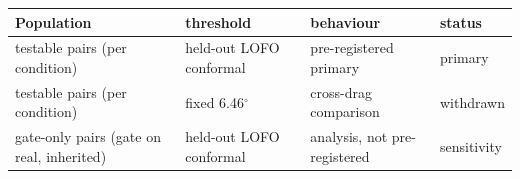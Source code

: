 \begin{tabular}{llll}
\toprule
Population & threshold & behaviour & status \\
\midrule
testable pairs (per condition) & held-out LOFO conformal & pre-registered primary & primary \\
testable pairs (per condition) & fixed 6.46$^\circ$ & cross-drag comparison & withdrawn \\
gate-only pairs (gate on real, inherited) & held-out LOFO conformal & analysis, not pre-registered & sensitivity \\
\bottomrule
\end{tabular}
